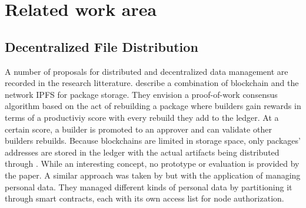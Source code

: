 \documentclass[english, biblatex, digitaloutput]{kththesis}
\begin{document}

\section{Related work area}

\subsection{Decentralized File Distribution}

A number of proposals for distributed and decentralized data management are recorded in the research litterature. \textcite{ince_blockchain_2020} describe a combination of blockchain and the  network \gls{IPFS} for package storage. They envision a proof-of-work consensus algorithm based on the act of rebuilding a package where builders gain rewards in terms of a productiviy score with every rebuild they add to the ledger. At a certain score, a builder is promoted to an approver and can validate other builders rebuilds. Because blockchains are limited in storage space, only packages' addresses are stored in the ledger with the actual artifacts being distributed through . While an interesting concept, no prototype or evaluation is provided by the paper. A similar approach was taken by \textcite{zichichi_efficiency_2020} but with the application of managing personal data. They managed different kinds of personal data by partitioning it through smart contracts, each with its own access list for node authorization.
\end{document}

